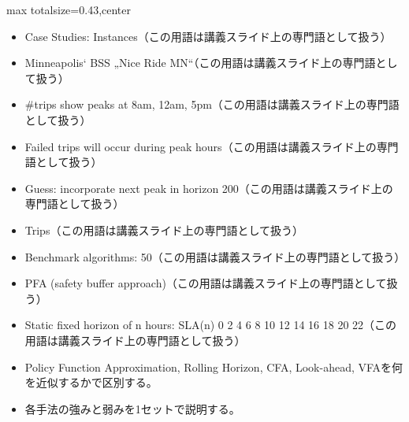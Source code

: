 \clearpage
{}
\begin{minipage}[t]{0.405\textwidth}
\begin{adjustbox}{max totalsize={\textwidth}{0.43\textheight},center}
\begin{minipage}{\textwidth}\scriptsize
{}\begin{itemize}
\item Case Studies: Instances（この用語は講義スライド上の専門語として扱う）
\item Minneapolis‘ BSS „Nice Ride MN“（この用語は講義スライド上の専門語として扱う）
\item \#trips show peaks at 8am, 12am, 5pm（この用語は講義スライド上の専門語として扱う）
\item Failed trips will occur during peak hours（この用語は講義スライド上の専門語として扱う）
\item Guess: incorporate next peak in horizon 200（この用語は講義スライド上の専門語として扱う）
\item Trips（この用語は講義スライド上の専門語として扱う）
\item Benchmark algorithms: 50（この用語は講義スライド上の専門語として扱う）
\item PFA (safety buffer approach)（この用語は講義スライド上の専門語として扱う）
\item Static fixed horizon of n hours: SLA(n) 0 2 4 6 8 10 12 14 16 18 20 22（この用語は講義スライド上の専門語として扱う）
\end{itemize}\begin{itemize}
\item Policy Function Approximation, Rolling Horizon, CFA, Look-ahead, VFAを何を近似するかで区別する。
\item 各手法の強みと弱みを1セットで説明する。
\end{itemize}
\end{minipage}
\end{adjustbox}
\end{minipage}\hfill
